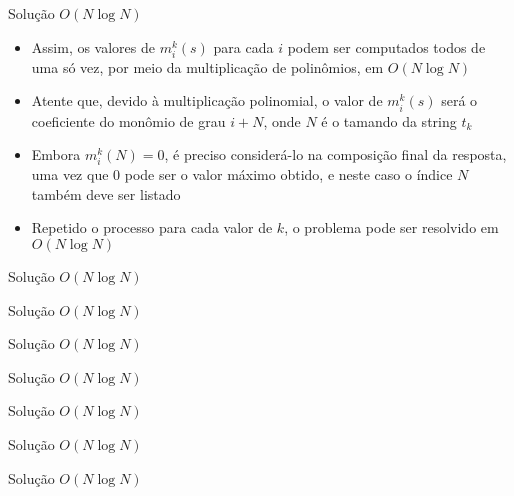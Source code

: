 \begin{frame}[fragile]{Solução $O(N\log N)$}

    \begin{itemize}
        \item Assim, os valores de $m^k_i(s)$ para cada $i$ podem ser computados todos de uma
            só vez, por meio da multiplicação de polinômios, em $O(N\log N)$

        \item Atente que, devido à multiplicação polinomial, o valor de $m^k_i(s)$ será o 
            coeficiente do monômio de grau $i + N$, onde $N$ é o tamando da string $t_k$

        \item Embora $m^k_i(N) = 0$, é preciso considerá-lo na composição final da resposta,
            uma vez que $0$ pode ser o valor máximo obtido, e neste caso o índice $N$ também
            deve ser listado

        \item Repetido o processo para cada valor de $k$, o problema pode ser resolvido em
            $O(N\log N)$
    \end{itemize}

\end{frame}

\begin{frame}[fragile]{Solução $O(N\log N)$}
\end{frame}

\begin{frame}[fragile]{Solução $O(N\log N)$}
\end{frame}

\begin{frame}[fragile]{Solução $O(N\log N)$}
\end{frame}

\begin{frame}[fragile]{Solução $O(N\log N)$}
\end{frame}

\begin{frame}[fragile]{Solução $O(N\log N)$}
\end{frame}

\begin{frame}[fragile]{Solução $O(N\log N)$}
\end{frame}

\begin{frame}[fragile]{Solução $O(N\log N)$}
\end{frame}
